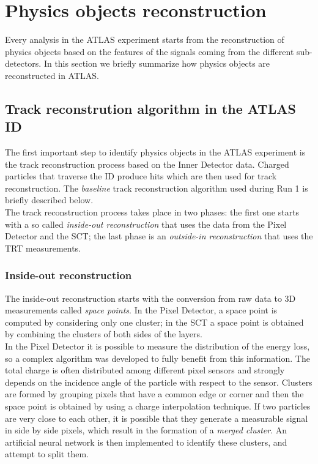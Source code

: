 \documentclass[a4paper,twoside,12pt]{article}
\begin{document}
\clearpage

\section{Physics objects reconstruction}
Every analysis in the ATLAS experiment starts from the reconstruction of physics objects
based on the features of the signals coming from the different sub-detectors\cite{PhysicsObjectReconstruction}. In this section we briefly
summarize how physics objects are reconstructed in ATLAS.\\

\subsection{Track reconstrution algorithm in the ATLAS ID}
The first important step to identify physics objects in the ATLAS experiment is the track reconstruction process based on the Inner Detector data. Charged particles that
traverse the ID produce hits which are then used for track reconstruction. The \textit{baseline} track reconstruction
algorithm\cite{OptimizationTrackReconstructionAlgorithm} used during Run 1 is briefly described below.\\

The track reconstruction process takes place in two phases: the first one starts with a so called \textit{inside-out reconstruction} that uses the data from the Pixel Detector and the SCT; the last phase is an \textit{outside-in reconstruction} that uses the TRT measurements. \\

\subsubsection*{Inside-out reconstruction}
The inside-out reconstruction starts with the conversion from raw data to 3D measurements called \textit{space points}. In the Pixel Detector, a space point is computed by
considering only one cluster; in the SCT a space point
is obtained by combining the clusters of both sides of the layers.  \\

In the Pixel Detector it is
possible to measure the distribution of the energy loss, so a complex algorithm was developed
to fully benefit from this information.  
The total charge is often distributed among different pixel sensors and strongly depends on the 
incidence angle of the particle with respect to the sensor. Clusters are formed by grouping 
pixels that have a common edge or corner and then the space point is obtained by using a 
charge interpolation technique. If two particles are very close to each other, it is possible
that they generate a measurable signal in side by side pixels, which result in the formation of
a \textit{merged cluster}. An artificial neural network is then implemented to identify these clusters, and attempt to split them.\\
\end{document}
